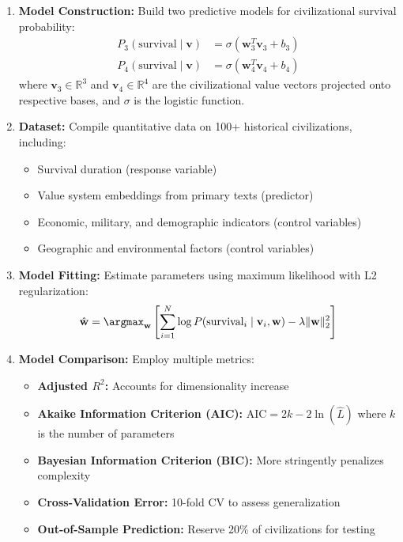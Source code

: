 \documentclass[11pt,a4paper]{article}
\theoremstyle{definition}
\theoremstyle{remark}
\begin{document}
\begin{enumerate}
    \item \textbf{Model Construction:} Build two predictive models for civilizational survival probability:
    \begin{align}
        P_3(\text{survival} \mid \mathbf{v}) &= \sigma(\mathbf{w}_3^T \mathbf{v}_3 + b_3) \\
        P_4(\text{survival} \mid \mathbf{v}) &= \sigma(\mathbf{w}_4^T \mathbf{v}_4 + b_4)
    \end{align}
    where \(\mathbf{v}_3 \in \mathbb{R}^3\) and \(\mathbf{v}_4 \in \mathbb{R}^4\) are the civilizational value vectors projected onto respective bases, and \(\sigma\) is the logistic function.
    
    \item \textbf{Dataset:} Compile quantitative data on 100+ historical civilizations, including:
    \begin{itemize}
        \item Survival duration (response variable)
        \item Value system embeddings from primary texts (predictor)
        \item Economic, military, and demographic indicators (control variables)
        \item Geographic and environmental factors (control variables)
    \end{itemize}
    
    \item \textbf{Model Fitting:} Estimate parameters using maximum likelihood with L2 regularization:
    \begin{equation}
        \hat{\mathbf{w}} = \argmax_{\mathbf{w}} \left[\sum_{i=1}^{N} \log P(\text{survival}_i \mid \mathbf{v}_i, \mathbf{w}) - \lambda \|\mathbf{w}\|_2^2\right]
    \end{equation}
    
    \item \textbf{Model Comparison:} Employ multiple metrics:
    \begin{itemize}
        \item \textbf{Adjusted \(R^2\):} Accounts for dimensionality increase
        \item \textbf{Akaike Information Criterion (AIC):} \(\text{AIC} = 2k - 2\ln(\hat{L})\) where \(k\) is the number of parameters
        \item \textbf{Bayesian Information Criterion (BIC):} More stringently penalizes complexity
        \item \textbf{Cross-Validation Error:} 10-fold CV to assess generalization
        \item \textbf{Out-of-Sample Prediction:} Reserve 20\% of civilizations for testing
    \end{itemize}
    

\end{enumerate}
\end{document}
